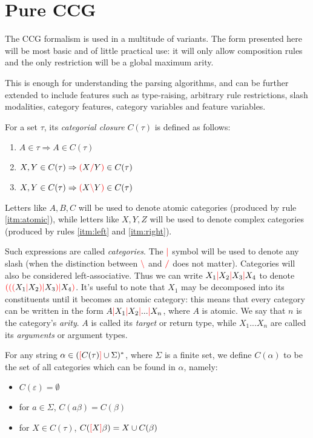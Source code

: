 \documentclass[main.tex]{subfiles}
\begin{document}
\section{Pure CCG}
The CCG formalism is used in a multitude of variants. The form presented here
will be most basic and of little practical use: it will only allow composition
rules and the only restriction will be a global maximum arity.

This is enough for understanding the parsing algorithms, and can be further
extended to include features such as type-raising,
arbitrary rule restrictions, slash modalities,
category features, category variables and feature variables.

\begin{defn}
    For a set $\tau$, its \emph{categorial closure} $C(\tau)$ is defined as follows:
    \begin{enumerate}
        \item \label{itm:atomic} $A \in \tau \Rightarrow A \in C(\tau)$
        \item \label{itm:right}  $X, Y \in C(\tau) \Rightarrow \textcolor{red}{(} X \textcolor{red}{/} Y \textcolor{red}{)} \in C(\tau)$
        \item \label{itm:left}   $X, Y \in C(\tau) \Rightarrow \textcolor{red}{(} X \textcolor{red}{\backslash} Y \textcolor{red}{)} \in C(\tau)$
    \end{enumerate}

    Letters like $A, B, C$ will be used to denote atomic categories (produced
    by rule \ref{itm:atomic}), while letters like $X, Y, Z$ will be used to
    denote complex categories (produced by rules \ref{itm:left} and \ref{itm:right}).

    Such expressions are called \emph{categories}. The $\textcolor{red}{|}$ symbol will be
    used to denote any slash (when the distinction between $\textcolor{red}{\backslash}$ and $\textcolor{red}{/}$
    does not matter). Categories will also be considered left-associative.
    Thus we can write $X_1 \textcolor{red}{|} X_2 \textcolor{red}{|} X_3 \textcolor{red}{|} X_4$ to denote
    $\textcolor{red}{(} \textcolor{red}{(} \textcolor{red}{(} X_1 \textcolor{red}{|} X_2 \textcolor{red}{)} \textcolor{red}{|} X_3 \textcolor{red}{)} \textcolor{red}{|} X_4 \textcolor{red}{)}$. It's useful to note that $X_1$ may
    be decomposed into its constituents until it becomes an atomic category:
    this means that every category can be written in the form
    $A \textcolor{red}{|} X_1 \textcolor{red}{|} X_2 \textcolor{red}{|} ... \textcolor{red}{|} X_n$, where $A$ is atomic. We say that
    $n$ is the category's \emph{arity}. $A$ is called its \emph{target} or
    return type, while
    $X_1 ... X_n$ are called its \emph{arguments} or argument types.

    For any string $\alpha \in (\textcolor{red}{[} C(\tau) \textcolor{red}{]} \cup \Sigma)^*$, where $\Sigma$ is a
    finite set, we define $C(\alpha)$ to be the set of all categories which
    can be found in $\alpha$, namely:
    \begin{itemize}
        \item $C(\varepsilon) = \emptyset$
        \item for $a \in \Sigma$, $C(a\beta) = C(\beta)$
        \item for $X \in C(\tau)$, $C(\textcolor{red}{[} X \textcolor{red}{]} \beta) = X \cup C(\beta)$
    \end{itemize}
\end{defn}
\end{document}
